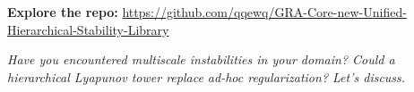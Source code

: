 \documentclass[11pt,a4paper]{article}
\begin{document}
\vspace{1em}
\noindent\textbf{Explore the repo:} \url{https://github.com/qqewq/GRA-Core-new-Unified-Hierarchical-Stability-Library}

\vspace{0.5em}
\noindent\emph{Have you encountered multiscale instabilities in your domain? Could a hierarchical Lyapunov tower replace ad-hoc regularization? Let's discuss.}

\end{document}
